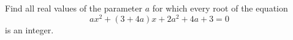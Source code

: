 Find all real values of the parameter $a$ for which every root of the equation
\[ax^2+(3+4a)x+2a^2+4a+3=0\]
is an integer.
